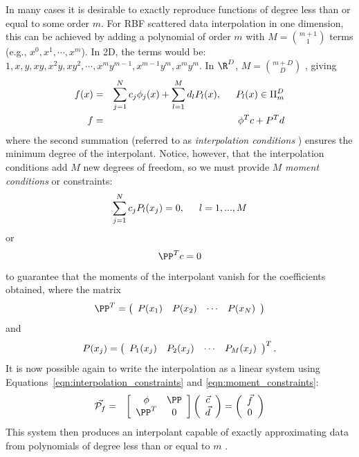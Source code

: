 \documentclass{report}
\begin{document}
{%
In many cases it is desirable to exactly reproduce functions of degree less than or equal to some order $m$. For RBF scattered data interpolation in one dimension, this can be achieved by adding a polynomial of order $m$ with $M =$${m+1}\choose{1}$ terms (e.g., $x^0, x^1, \cdots, x^{m}$). In 2D, the terms would be: $1, x, y, xy, x^2y, xy^2, \cdots, x^{m}y^{m-1}, x^{m-1}y^{m}, x^my^m$. In $\R^D$, $M =$${m+D}\choose{D}$ \cite{Iske2004}, giving
\begin{eqnarray}
f(x) & = & \sum_{j=1}^{N} c_{j}  \phi_j(x)  +  \sum_{l=1}^{M} d_{l} P_l(x),  \hskip1.5em  P_l(x) \in \Pi^{D}_{m} \\
f & = & \phi^T c + P^T d
\label{eqn:interpolation_constraints}
\end{eqnarray}
where the second summation (referred to as \emph{interpolation conditions} \cite{Iske2004}) ensures the minimum degree of the interpolant.  Notice, however, that the interpolation conditions add $M$ new degrees of freedom, so we must provide $M$ \emph{moment conditions} or constraints:
$$
\sum_{j=1}^{N} c_{j} P_l(x_j) = 0,  \hskip1.5em  l=1,..., M 
$$
or 
$$
\PP^T {c}  = {0} 
\label{eqn:moment_constraints}
$$
to guarantee that the moments of the interpolant vanish for the coefficients obtained, where the matrix
$$ \PP^T = \parray{cccc}{P(x_1) & P(x_2) & \cdots & P(x_N)}  $$
and 
$$ P(x_j) = \parray{cccc}{P_1(x_j) & P_2(x_j) & \cdots & P_M(x_j)}^T . $$
It is now possible again to write the interpolation as a linear system using Equations~\ref{eqn:interpolation_constraints} and \ref{eqn:moment_constraints}:%
\begin{eqnarray}
\vec{\mathcal{P}_f} & = & \left[ \begin{array}{c c} 
	\phi & \PP \\
	\PP^T & 0
	\end{array} \right] \left( \begin{array}{c}
							\vec{c} \\
							\vec{d}
							 \end{array}
						 \right) = \left( \begin{array}{c}
							\vec{f} \\
							0
							 \end{array}
						 \right) 
\end{eqnarray}
This system then produces an interpolant capable of exactly approximating data from polynomials of degree less than or equal to $m$ \cite{Fasshauer2007}. 

}
\end{document}
